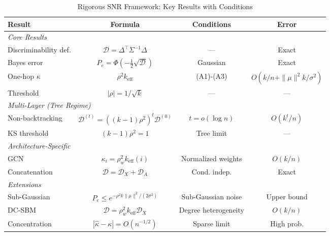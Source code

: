 \begin{table}[t]
\centering
\caption{Rigorous SNR Framework: Key Results with Conditions}
\label{tab:rigorous_summary}
\begin{tabular}{@{}lccc@{}}
\toprule
\textbf{Result} & \textbf{Formula} & \textbf{Conditions} & \textbf{Error} \\
\midrule
\multicolumn{4}{l}{\textit{Core Results}} \\
Discriminability def. & $\mathcal{D} = \Delta^\top \Sigma^{-1} \Delta$ & --- & Exact \\
Bayes error & $P_e = \Phi(-\frac{1}{2}\sqrt{\mathcal{D}})$ & Gaussian & Exact \\
One-hop $\kappa$ & $\rho^2 k_{\mathrm{eff}}$ & (A1)-(A3) & $O(k/n + \|\mu\|^2 k/\sigma^2)$ \\
Threshold & $|\rho| = 1/\sqrt{k}$ & --- & --- \\
\midrule
\multicolumn{4}{l}{\textit{Multi-Layer (Tree Regime)}} \\
Non-backtracking & $\mathcal{D}^{(t)} = ((k-1)\rho^2)^t \mathcal{D}^{(0)}$ & $t = o(\log n)$ & $O(k^t/n)$ \\
KS threshold & $(k-1)\rho^2 = 1$ & Tree limit & --- \\
\midrule
\multicolumn{4}{l}{\textit{Architecture-Specific}} \\
GCN & $\kappa_i = \rho_w^2 k_{\mathrm{eff}}(i)$ & Normalized weights & $O(k/n)$ \\
Concatenation & $\mathcal{D} = \mathcal{D}_X + \mathcal{D}_A$ & Cond. indep. & Exact \\
\midrule
\multicolumn{4}{l}{\textit{Extensions}} \\
Sub-Gaussian & $P_e \leq e^{-\rho^2 k \|\mu\|^2/(2\sigma^2)}$ & Sub-Gaussian noise & Upper bound \\
DC-SBM & $\mathcal{D} = \rho_w^2 k_{\mathrm{eff}} \mathcal{D}_X$ & Degree heterogeneity & $O(k/n)$ \\
Concentration & $|\hat{\kappa} - \kappa| = O(n^{-1/2})$ & Sparse limit & High prob. \\
\bottomrule
\end{tabular}
\end{table}



